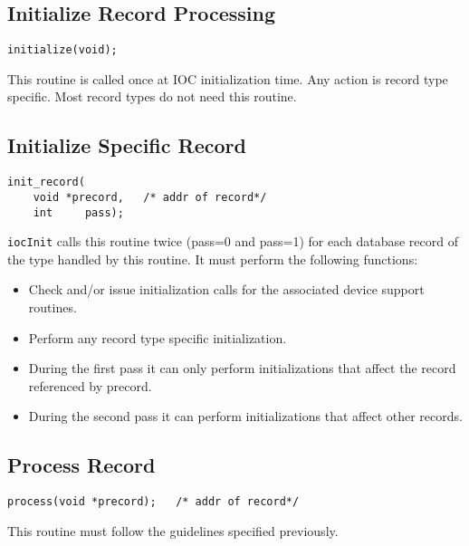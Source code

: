 \subsection{Initialize Record Processing}

\begin{verbatim}
initialize(void);
\end{verbatim}

This routine is called once at IOC initialization time. Any action is record type specific. Most record types do not need 
this routine.

\subsection{Initialize Specific Record}

\begin{verbatim}
init_record(
    void *precord,   /* addr of record*/
    int     pass);
\end{verbatim}

\verb|iocInit| calls this routine twice (pass=0 and pass=1) for each database record of the type handled by this routine. It must 
perform the following functions:

\begin{itemize}
\item Check and/or issue initialization calls for the associated device support routines.

\item Perform any record type specific initialization.

\item During the first pass it can only perform initializations that affect the record referenced by precord. 

\item During the second pass it can perform initializations that affect other records.

\end{itemize}

\subsection{Process Record}

\begin{verbatim}
process(void *precord);   /* addr of record*/
\end{verbatim}

This routine must follow the guidelines specified previously.

